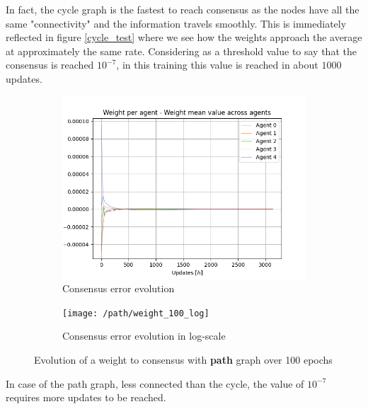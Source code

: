 \documentclass[a4paper,11pt,oneside]{book}
\begin{document}
In fact, the cycle graph is the fastest to reach consensus as the nodes have all the same "connectivity" and the information travels smoothly. This is immediately reflected in figure \ref{cycle_test} where we see how the weights approach the average at approximately the same rate. Considering as a threshold value to say that the consensus is reached $10^{-7}$, in this training this value is reached in about $1000$ updates.

\begin{figure}[h]
\centering
	\begin{subfigure}{0.49\textwidth}	
	\includegraphics[width=\textwidth]{path/weight_100}
	\caption{Consensus error evolution}
	\end{subfigure}
\hfill
	\begin{subfigure}{0.49\textwidth}	
	\texttt{[image: /path/weight\_100\_log]}
	\caption{Consensus error evolution in log-scale}
	\end{subfigure}
\caption{Evolution of a weight to consensus with \textbf{path} graph over 100 epochs}
\label{path_test}
\end{figure}

In case of the path graph, less connected than the cycle, the value of $10^{-7}$ requires more updates to be reached.
\end{document}
